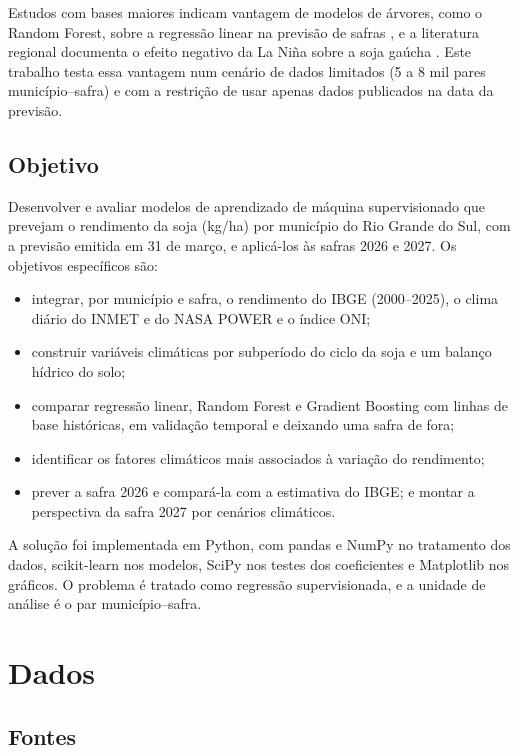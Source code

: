 \documentclass[12pt]{article}
\begin{document}
Estudos com bases maiores indicam vantagem de modelos de árvores, como o
Random Forest, sobre a regressão linear na previsão de safras
\cite{jeong2016,vanklompenburg2020,vonbloh2023}, e a literatura regional
documenta o efeito negativo da La Niña sobre a soja gaúcha
\cite{pilau2022,noia2020}. Este trabalho testa essa vantagem num cenário
de dados limitados (5 a 8 mil pares município--safra) e com a restrição
de usar apenas dados publicados na data da previsão.

\subsection{Objetivo}

Desenvolver e avaliar modelos de aprendizado de máquina supervisionado que
prevejam o rendimento da soja (kg/ha) por município do Rio Grande do Sul,
com a previsão emitida em 31 de março, e aplicá-los às safras 2026 e 2027.
Os objetivos específicos são:

\begin{itemize}
  \item integrar, por município e safra, o rendimento do IBGE
    (2000--2025), o clima diário do INMET e do NASA POWER e o índice ONI;
  \item construir variáveis climáticas por subperíodo do ciclo da soja e
    um balanço hídrico do solo;
  \item comparar regressão linear, Random Forest e Gradient Boosting com
    linhas de base históricas, em validação temporal e deixando uma safra
    de fora;
  \item identificar os fatores climáticos mais associados à variação do
    rendimento;
  \item prever a safra 2026 e compará-la com a estimativa do IBGE; e
    montar a perspectiva da safra 2027 por cenários climáticos.
\end{itemize}

A solução foi implementada em Python, com pandas e NumPy no tratamento dos
dados, scikit-learn \cite{pedregosa2011} nos modelos, SciPy nos testes dos
coeficientes e Matplotlib nos gráficos. O problema é tratado como
regressão supervisionada, e a unidade de análise é o par município--safra.

\section{Dados}

\subsection{Fontes}
\end{document}
